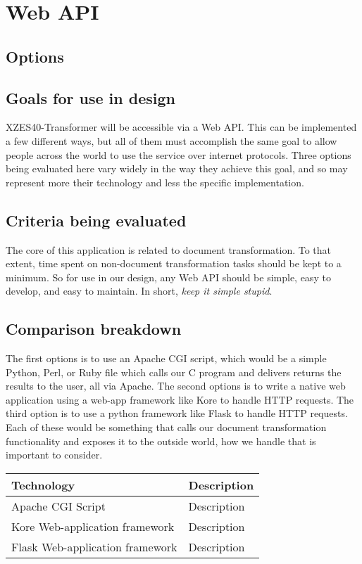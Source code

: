 \section{Web API}

\subsection{Options}

\subsection{Goals for use in design}

XZES40-Transformer will be accessible via a Web API.
This can be implemented a few different ways, but all of them must accomplish the same goal to allow people across the world to use the service over internet protocols.
Three options being evaluated here vary widely in the way they achieve this goal, and so may represent more their technology and less the specific implementation.

\subsection{Criteria being evaluated}

The core of this application is related to document transformation.
To that extent, time spent on non-document transformation tasks should be kept to a minimum.
So for use in our design, any Web API should be simple, easy to develop, and easy to maintain.
In short, \textit{keep it simple stupid}.

\subsection{Comparison breakdown}

The first options is to use an Apache CGI script, which would be a simple Python, Perl, or Ruby file which calls our C program and delivers returns the results to the user, all via Apache.
The second options is to write a native web application using a web-app framework like Kore to handle HTTP requests.
The third option is to use a python framework like Flask to handle HTTP requests.
Each of these would be something that calls our document transformation functionality and exposes it to the outside world, how we handle that is important to consider.

\begin{center}
    \begin{tabular}{ | l | p{10cm} |}
    \hline
    Technology & Description  \\ \hline
    Apache CGI Script & Description \\ \hline
    Kore Web-application framework & Description \\ \hline
    Flask Web-application framework & Description \\ \hline
    \end{tabular}
\end{center}

